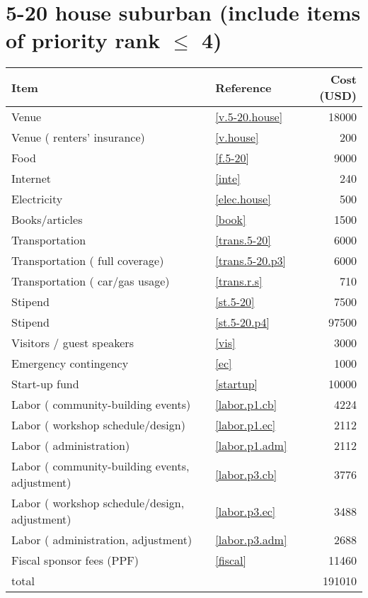\section*{5-20 house suburban (include items of priority rank $\leq$ 4)}
\begin{center}
\begin{tabular}{llr}
Item & Reference & Cost (USD) \\ \hline
Venue & \ref{v.5-20.house} & 18000 \\
Venue ( renters' insurance) & \ref{v.house} & 200 \\
Food & \ref{f.5-20} & 9000 \\
Internet & \ref{inte} & 240 \\
Electricity & \ref{elec.house} & 500 \\
Books/articles & \ref{book} & 1500 \\
Transportation & \ref{trans.5-20} & 6000 \\
Transportation ( full coverage) & \ref{trans.5-20.p3} & 6000 \\
Transportation ( car/gas usage) & \ref{trans.r.s} & 710 \\
Stipend & \ref{st.5-20} & 7500 \\
Stipend & \ref{st.5-20.p4} & 97500 \\
Visitors / guest speakers & \ref{vis} & 3000 \\
Emergency contingency & \ref{ec} & 1000 \\
Start-up fund & \ref{startup} & 10000 \\
Labor ( community-building events) & \ref{labor.p1.cb} & 4224 \\
Labor ( workshop schedule/design) & \ref{labor.p1.ec} & 2112 \\
Labor ( administration) & \ref{labor.p1.adm} & 2112 \\
Labor ( community-building events, adjustment) & \ref{labor.p3.cb} & 3776 \\
Labor ( workshop schedule/design, adjustment) & \ref{labor.p3.ec} & 3488 \\
Labor ( administration, adjustment) & \ref{labor.p3.adm} & 2688 \\
Fiscal sponsor fees (PPF) & \ref{fiscal} & 11460 \\ \hline
total &  & 191010
\end{tabular}
\end{center}
\newpage
